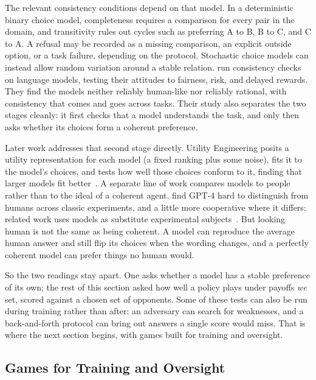 The relevant consistency conditions depend on that model. In a deterministic binary
choice model, completeness requires a comparison for every pair in the domain, and
transitivity rules out cycles such as preferring A to B, B to C, and C to A. A refusal
may be recorded as a missing comparison, an explicit outside option, or a task failure,
depending on the protocol. Stochastic choice models can instead allow random variation
around a stable relation. \citet{RossKimLo2024} run consistency checks on language
models, testing their attitudes to fairness, risk, and delayed rewards. They find the
models neither reliably human-like nor reliably rational, with consistency that comes
and goes across tasks. Their study also separates the two stages cleanly: it first
checks that a model understands the task, and only then asks whether its choices form
a coherent preference.

Later work addresses that second stage directly. Utility Engineering posits a utility
representation for each model (a fixed ranking plus some noise), fits it to the
model's choices, and tests how well those choices conform to it, finding that larger
models fit better~\citep{Mazeika2025}. A
separate line of work compares models to people rather than to the ideal of a coherent
agent. \citet{Mei2024} find GPT-4 hard to distinguish from humans across classic
experiments, and a little more cooperative where it differs; related work uses models
as substitute experimental subjects~\citep{Horton2023,Aher2023}. But looking human is
not the same as being coherent. A model can reproduce the average human answer and
still flip its choices when the wording changes, and a perfectly coherent model can
prefer things no human would.

So the two readings stay apart. One asks whether a model has a stable preference of
its own; the rest of this section asked how well a policy plays under payoffs
\emph{we} set, scored against a chosen set of opponents. Some of these tests can also
be run during training rather than after: an adversary can search for weaknesses, and a
back-and-forth protocol can bring out answers a single score would miss. That is where
the next section begins, with games built for training and oversight.


\subsection{Games for Training and Oversight}
\label{sec:gt4ai:training}

